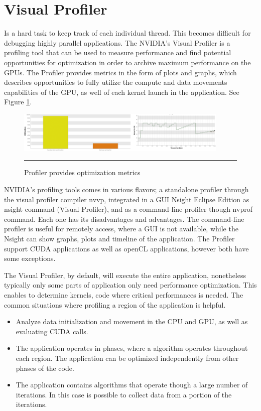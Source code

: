 \section{Visual Profiler}

Is a hard task to keep track of each individual thread. This becomes difficult for debugging highly parallel applications. The NVIDIA's Visual Profiler is a profiling tool that can be used to measure performance and find potential opportunities for optimization in order to archive maximum performance on the GPUs. The Profiler provides metrics in the form of plots and graphs, which describes opportunities to fully utilize the compute and data movements capabilities of the GPU, as well of each kernel launch in the application. See Figure \ref{fig:visualgraph}.

\begin{figure}[htbp]
	\centering
		\includegraphics[width=0.9\textwidth]{Figures/visualgraph.png}
		\rule{35em}{0.2pt}
	\caption[Visual Profiler metrics graphs and plots]{Profiler provides optimization metrics}
	\label{fig:visualgraph}
\end{figure}

NVIDIA's profiling tools comes in various flavors; a standalone profiler through the visual profiler compiler nvvp, integrated in a GUI Nsight Eclipse Edition as nsight command (Visual Profiler), and as a command-line profiler though nvprof command. Each one has its disadvantages and advantages. The command-line profiler is useful for remotely access, where a GUI is not available, while the Nsight can show graphs, plots and timeline of the application. The Profiler support CUDA applications as well as openCL applications, however both have some exceptions. 

The Visual Profiler, by default, will execute the entire application, nonetheless typically only some parts of application only need performance optimization. This enables to determine kernels, code where critical performances is needed. The common situations where profiling a region of the application is helpful.\cite{tool}

\begin{itemize}
  \item Analyze data initialization and movement in the CPU and GPU, as well as evaluating CUDA calls.
  \item The application operates in phases, where a algorithm operates throughout each region. The application can be optimized independently from other phases of the code.
  \item The application contains algorithms that operate though a large number of iterations. In this case is possible to collect data from a portion of the iterations.
\end{itemize}

